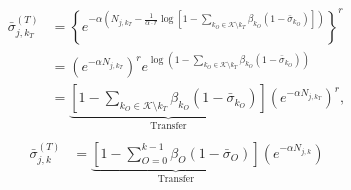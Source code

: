 \begin{align}
	\begin{split}
		\bar{\sigma}^{(T)}_{j,k_T} &= \left\{ e^{-\alpha \left(N_{j,k_T} - \frac{1}{\alpha \cdot r}  \log\left[ 1- \sum\limits_{k_O\in \mathcal{K} \setminus k_T}\beta_{k_O}\left(1 - \bar{\sigma}_{k_O}\right) \right] \right)}\right\}^r\\
		&= \left(e^{-\alpha {N_{j,k_T}}} \right)^r e^{ \log\left( 1-\sum\limits_{k_O \in \mathcal{K} \setminus k_T}\beta_{k_O}\left(1 - \bar{\sigma}_{k_O}\right) \right) }\\
		&= \underbrace{\left[1- \sum\limits_{k_O \in \mathcal{K} \setminus k_T}\beta_{k_O} \left( 1 - \bar{\sigma}_{k_O} \right)\right]}_{\text{Transfer}} \left(e^{-\alpha N_{j,k_T}} \right)^r ,
	\end{split}
\end{align}
\begin{align}
	\begin{split}
		\bar{\sigma}^{(T)}_{j,k} 
		&= \underbrace{\left[1- \sum\limits_{O = 0}^{k-1}\beta_{O} \left( 1 - \bar{\sigma}_{O} \right)\right]}_{\text{Transfer}} \left(e^{-\alpha N_{j,k}} \right)
	\end{split}
\end{align}


